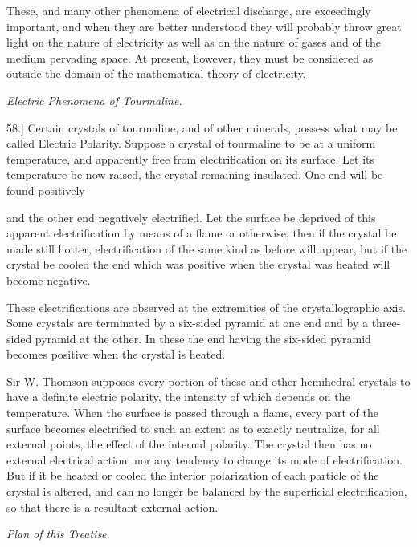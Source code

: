 \documentclass[11pt,a4paper]{article}
\begin{document}
These, and many other phenomena of electrical discharge, are
exceedingly important, and when they are better understood they
will probably throw great light on the nature of electricity as well
as on the nature of gases and of the medium pervading space. At
present, however, they must be considered as outside the domain of
the mathematical theory of electricity.

\begin{center}
\textit{Electric Phenomena of Tourmaline.}
\end{center}

58.] Certain crystals of tourmaline, and of other minerals, possess
what may be called Electric Polarity. Suppose a crystal of
tourmaline to be at a uniform temperature, and apparently free from
electrification on its surface. Let its temperature be now raised,
the crystal remaining insulated. One end will be found positively

\clearpage
\setcounter{footnote}{0}

and the other end negatively electrified. Let the surface be deprived
of this apparent electrification by means of a flame or otherwise,
then if the crystal be made still hotter, electrification of the
same kind as before will appear, but if the crystal be cooled the
end which was positive when the crystal was heated will become
negative.

These electrifications are observed at the extremities of the
crystallographic axis. Some crystals are terminated by a six-sided
pyramid at one end and by a three-sided pyramid at the other.
In these the end having the six-sided pyramid becomes positive
when the crystal is heated.

Sir W. Thomson supposes every portion of these and other
hemihedral crystals to have a definite electric polarity, the intensity
of which depends on the temperature. When the surface is passed
through a flame, every part of the surface becomes electrified to
such an extent as to exactly neutralize, for all external points,
the effect of the internal polarity. The crystal then has no
external electrical action, nor any tendency to change its mode of
electrification. But if it be heated or cooled the interior polarization
of each particle of the crystal is altered, and can no longer
be balanced by the superficial electrification, so that there is a
resultant external action.

\begin{center}
\textit{Plan of this Treatise.}
\end{center}
\end{document}
